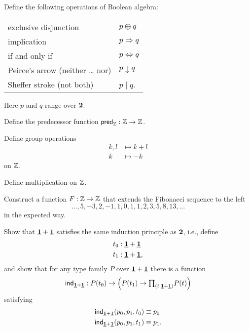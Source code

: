 \begin{exercises}
\item \label{ex:boolean-operation}Define the following operations of Boolean algebra:
  \begin{center}
    \begin{tabular}{ll}
      exclusive disjunction & $p \oplus q$ \\
      implication & $p \Rightarrow q$ \\
      if and only if & $p \Leftrightarrow q$ \\
      Peirce's arrow (neither \dots{} nor) & $p \downarrow q$ \\
      Sheffer stroke (not both) & $p\mid q$.
    \end{tabular}
  \end{center}
  Here $p$ and $q$ range over $\mathbf{2}$. 
\item \label{ex:int_pred}Define the predecessor function $\mathsf{pred}_{\mathbb{Z}}:{\mathbb{Z}}\to {\mathbb{Z}}$.
\item \label{ex:int_group_ops}Define group operations
  \begin{align*}
    k,l & \mapsto k+l \\
    k & \mapsto -k
  \end{align*}
  on ${\mathbb{Z}}$.
\item Define multiplication on ${\mathbb{Z}}$.
\item Construct a function $F:{\mathbb{Z}}\to{\mathbb{Z}}$ that extends the Fibonacci sequence to the left
  \begin{equation*}
    \ldots,5,-3,2,-1,1,0,1,1,2,3,5,8,13,\ldots
  \end{equation*}
  in the expected way.
\item \label{ex:one_plus_one} Show that $\underline{\mathbf{1}}+\underline{\mathbf{1}}$ satisfies the same induction principle as $\mathbf{2}$, i.e., define
  \begin{align*}
    t_0 & : \underline{\mathbf{1}} + \underline{\mathbf{1}} \\
    t_1 & : \underline{\mathbf{1}} + \underline{\mathbf{1}},
  \end{align*}
  and show that for any type family $P$ over $\underline{\mathbf{1}}+\underline{\mathbf{1}}$ there is a function
  \begin{align*}
    \ind{\unit+\unit}:P(t_0)\to \Big(P(t_1)\to \prd{t:\unit+\unit}P(t)\Big)
  \end{align*}
  satisfying
  \begin{align*}
    \ind{\unit+\unit}(p_0,p_1,t_0) & \jdeq p_0 \\
    \ind{\unit+\unit}(p_0,p_1,t_1) & \jdeq p_1.

\end{align*}
\end{exercises}
